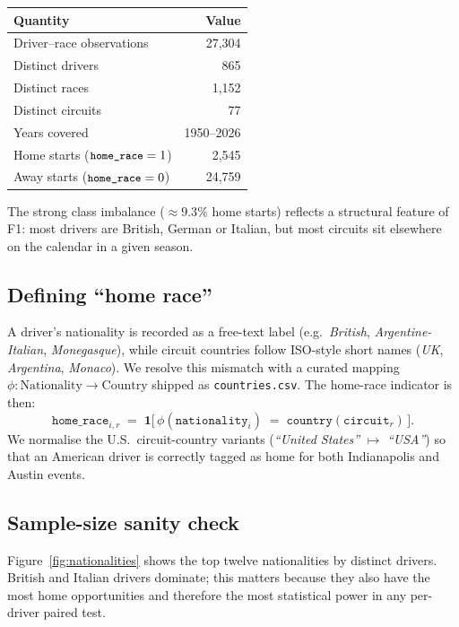 \documentclass[11pt,a4paper]{article}
\newcommand{\code}[1]{\texttt{\small #1}}
\begin{document}
\begin{center}
\begin{tabular}{lr}
\toprule
Quantity & Value \\
\midrule
Driver--race observations & 27{,}304 \\
Distinct drivers          & 865 \\
Distinct races            & 1{,}152 \\
Distinct circuits         & 77 \\
Years covered             & 1950--2026 \\
Home starts ($\code{home\_race}=1$)  & 2{,}545 \\
Away starts ($\code{home\_race}=0$)  & 24{,}759 \\
\bottomrule
\end{tabular}
\end{center}

The strong class imbalance ($\approx 9.3\%$ home starts) reflects a structural
feature of F1: most drivers are British, German or Italian, but most circuits
sit elsewhere on the calendar in a given season.

\subsection{Defining ``home race''}
A driver's nationality is recorded as a free-text label (e.g.\ \textit{British},
\textit{Argentine-Italian}, \textit{Monegasque}), while circuit countries
follow ISO-style short names (\textit{UK}, \textit{Argentina}, \textit{Monaco}).
We resolve this mismatch with a curated mapping
$\phi:\text{Nationality}\to\text{Country}$ shipped as \code{countries.csv}.
The home-race indicator is then:
\begin{equation}
    \texttt{home\_race}_{i,r}
    \;=\;
    \mathbf{1}\!\big[\,\phi(\texttt{nationality}_i)
    \;=\;\texttt{country}(\texttt{circuit}_r)\,\big].
\end{equation}
We normalise the U.S.\ circuit-country variants (\textit{``United States''}
$\mapsto$ \textit{``USA''}) so that an American driver is correctly tagged
as home for both Indianapolis and Austin events.

\subsection{Sample-size sanity check}
Figure~\ref{fig:nationalities} shows the top twelve nationalities by distinct
drivers. British and Italian drivers dominate; this matters because they also
have the most home opportunities and therefore the most statistical power in
any per-driver paired test.
\end{document}
